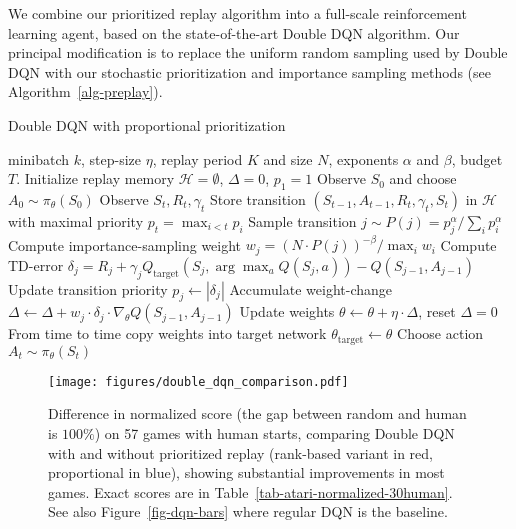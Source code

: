 \documentclass[a4paper]{article}
\begin{document}
We combine our prioritized replay algorithm into a full-scale reinforcement learning agent, based on the state-of-the-art Double DQN algorithm. Our principal modification is to replace the uniform random sampling used by Double DQN with our stochastic prioritization and importance sampling methods (see Algorithm~\ref{alg-preplay}).




\begin{algorithm}[tb]
   \caption{Double DQN with proportional prioritization}
   \label{alg-preplay}
\begin{algorithmic}[1]
    minibatch $k$, step-size $\eta$, replay period $K$ and size $N$, exponents $\alpha$ and $\beta$, budget $T$.
   \STATE Initialize replay memory $\mathcal{H}=\emptyset$, $\Delta = 0$, $p_1=1$
   \STATE Observe $S_0$ and choose $A_0 \sim \pi_{\theta}(S_0)$
   	  \STATE Observe $S_t, R_t, \gamma_t$
      \STATE Store transition $(S_{t-1}, A_{t-1}, R_t, \gamma_{t}, S_{t})$ in $\mathcal{H}$ with maximal priority $p_t = \max_{i<t} p_i$
          \STATE Sample transition $j \sim P(j) = p_j^{\alpha} / \sum_i p_i^{\alpha}$
          \STATE Compute importance-sampling weight $w_j = \left(N\cdot P(j)\right)^{-\beta} / \max_i w_i$
          \STATE Compute TD-error $\delta_j =  R_j + \gamma_j Q_{\text{target}}\left(S_j, \arg\max_a Q(S_j, a)\right) - Q(S_{j-1}, A_{j-1}) $
          \STATE Update transition priority $p_j \leftarrow |\delta_j|$ 
          \STATE Accumulate weight-change $\Delta \leftarrow \Delta + w_j \cdot \delta_j \cdot \nabla_{\theta} Q(S_{j-1}, A_{j-1})$
        \ENDFOR
        \STATE Update weights $\theta \leftarrow \theta + \eta \cdot \Delta $, reset $\Delta = 0$
        \STATE From time to time copy weights into target network $\theta_{\text{target}} \leftarrow \theta$
      \ENDIF
      \STATE Choose action $A_t \sim \pi_{\theta}(S_t)$
   \ENDFOR
\end{algorithmic}
\end{algorithm}

\begin{figure}[t]
\vspace{-1em}
\centerline{
\texttt{[image: figures/double\_dqn\_comparison.pdf]}
}
\vspace{-1em}
\caption{
\label{fig-gen-bars}
Difference in normalized score (the gap between random and human is $100\%$) on 57 games with human starts, comparing Double
DQN with and without prioritized replay (rank-based variant in red, proportional in blue), showing substantial improvements in most games.  Exact scores are in Table~\ref{tab-atari-normalized-30human}.
See also Figure~\ref{fig-dqn-bars} where regular DQN is the baseline.
\vspace{-1em}
}
\end{figure}
\end{document}
